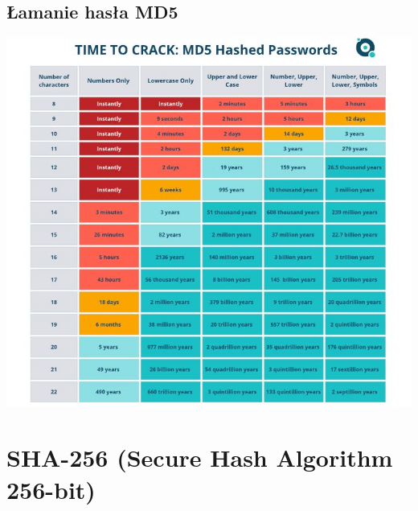 \documentclass[12pt, a4paper]{article}
\begin{document}
\subsection{Łamanie hasła MD5}
\begin{center}
\includegraphics[scale=0.50]{md5.JPG}
\end{center}
\section{SHA-256 (Secure Hash Algorithm 256-bit)}
\end{document}
